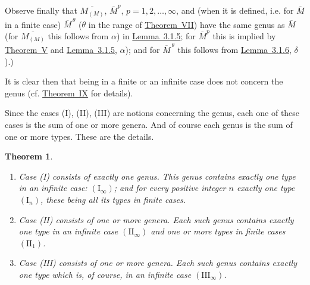 \documentclass[b5paper,twoside]{article}
\newcommand{\thmref}[2]{\hyperref[#1]{\mbox{Theorem~#2}}}
\newcommand{\lemref}[2]{\hyperref[#1]{\mbox{Lemma~#2}}}
\theoremstyle{mvnplain}
\newtheorem{theorem}{Theorem}
\newcommand{\M}{\mathbf M}
\def\M{M}%
\def\mathfrak#1{#1}%
\begin{document}
Observe finally that \(\overline{\M_{(\mathfrak M)}}\),
\(\overline{\M}^{p}\), \(p=1,2,\ldots,\infty\), and (when it is defined,
i.e. for \(\overline{\M}\) in a finite case)
\(\overline{\M}^{\,\theta}\) (\(\theta\) in the range of
\thmref{thm:VII}{VII}) have the same genus as \(\overline{\M}\) (for
\(\overline{\M_{(\mathfrak M)}}\) this follows from \(\alpha\)) in
\lemref{lem:3.1.5}{3.1.5}; for \(\overline{\M}^{p}\) this is implied by
\thmref{thm:V}{V} and \lemref{lem:3.1.5}{3.1.5}, \(\alpha\)); and for
\(\overline{\M}^{\,\theta}\) this follows from
\lemref{lem:3.1.6}{3.1.6}, \(\delta\)).)

It is clear then that being in a finite or an infinite case does not concern
the genus (cf. \thmref{thm:IX}{IX} for details).

Since the cases (I), (II), (III) are notions concerning the genus, each one of
these cases is the sum of one or more genera. And of course each genus is the
sum of one or more types. These are the details.

\begin{theorem}\label{thm:IX}
\begin{enumerate}[label={}]
\item[\(\alpha\))] Case (I) consists of exactly one genus. This genus contains exactly one
type in an infinite case: \((\mathrm I_\infty)\); and for every positive integer
\(n\) exactly one type \((\mathrm I_n)\), these being all its types in finite
cases.
\item[\(\beta\))] Case (II) consists of one or more genera. Each such genus contains
exactly one type in an infinite case \((\mathrm {II}_\infty)\) and one or more
types in finite cases \((\mathrm {II}_1)\).
\item[\(\gamma\))] Case (III) consists of one or more genera. Each such genus contains
exactly one type which is, of course, in an infinite case
\((\mathrm {III}_\infty)\).
\end{enumerate}
\end{theorem}
\end{document}
